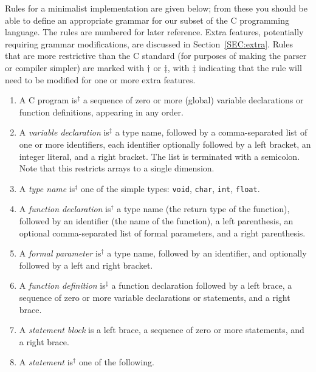 \documentclass{article}
\newcommand{\iseasier}{is$^\dagger$ }
\newcommand{\isextra}{is$^\ddagger$ }
\begin{document}
Rules for a minimalist implementation
are given below;
from these you should be able to define an appropriate grammar
for our subset of the C programming language.
The rules are numbered for later reference.
Extra features,
  potentially requiring grammar modifications,
are discussed in Section~\ref{SEC:extra}.
Rules that are more restrictive than the C standard
(for purposes of making the parser or compiler simpler)
are marked with $\dagger$ or $\ddagger$,
with $\ddagger$ indicating that the rule will need to be modified
for one or more extra features.

%
%
\begin{enumerate}
\item\label{Cprog}
  A C program \isextra a sequence of zero or more
  (global) variable declarations  %
  or function definitions,
  appearing in any order.

\item\label{vardec}
  A \emph{variable declaration} \isextra a type name,
  followed by a comma-separated list of one or more identifiers,
  each identifier optionally followed by a left bracket,
  an integer literal, and a right bracket.
  The list is terminated with a semicolon.
  Note that this restricts arrays to a single dimension.

\item\label{typename}
  A \emph{type name} \isextra one of the simple types:
    {\tt void}, {\tt char}, {\tt int}, {\tt float}.

\item
  A \emph{function declaration} \iseasier a type name
  (the return type of the function),
  followed by an identifier (the name of the function),
  a left parenthesis,
    an optional comma-separated list of formal parameters,
  and a right parenthesis.

\item
  A \emph{formal parameter} \iseasier a type name,
  followed by an identifier,
  and optionally followed by a left and right bracket.

\item \label{funcdef}
  A \emph{function definition} \isextra a function declaration
  followed by a left brace,
  a sequence of zero or more
    variable declarations or statements,
  and a right brace.

\item
  A \emph{statement block} is a left brace,
  a sequence of zero or more statements,
  and a right brace.

\item
  A \emph{statement} \iseasier one of the following.


\end{enumerate}
\end{document}
